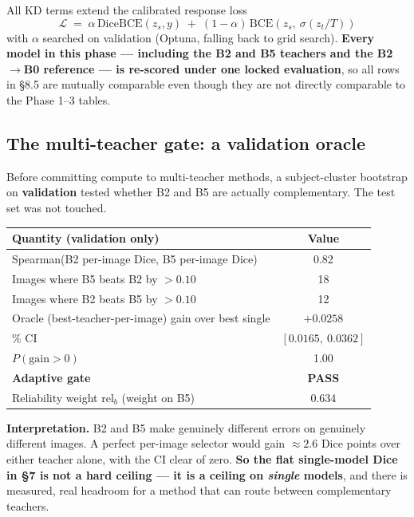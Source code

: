 \documentclass[11pt]{article}
\newcommand{\win}[1]{\textcolor{wingreen}{\textbf{#1}}}
\begin{document}
All KD terms extend the calibrated response loss
\[
  \mathcal{L}\;=\;\alpha\,\mathrm{DiceBCE}(z_s,y)\;+\;(1-\alpha)\,\mathrm{BCE}\!\left(z_s,\ \sigma(z_t/T)\right)
\]
with $\alpha$ searched on validation (Optuna, falling back to grid search). \textbf{Every model in this
phase --- including the B2 and B5 teachers and the B2$\to$B0 reference --- is re-scored under one
locked evaluation}, so all rows in \S8.5 are mutually comparable even though they are not directly
comparable to the Phase 1--3 tables.

\subsection{The multi-teacher gate: a validation oracle}

Before committing compute to multi-teacher methods, a subject-cluster bootstrap on
\textbf{validation} tested whether B2 and B5 are actually complementary. The test set was not
touched.

\begin{center}\small
\begin{tabular}{>{\raggedright\arraybackslash}p{8.6cm} C}
\toprule
\textbf{Quantity (validation only)} & \textbf{Value} \\
\midrule
Spearman(B2 per-image Dice, B5 per-image Dice)          & 0.82 \\
Images where B5 beats B2 by $>0.10$                     & 18 \\
Images where B2 beats B5 by $>0.10$                     & 12 \\
Oracle (best-teacher-per-image) gain over best single    & $+0.0258$ \\
\% CI                                            & $[0.0165,\ 0.0362]$ \\
\quad $P(\text{gain}>0)$                                 & 1.00 \\
\textbf{Adaptive gate}                                   & \win{PASS} \\
Reliability weight $\mathrm{rel}_b$ (weight on B5)       & 0.634 \\
\bottomrule
\end{tabular}
\end{center}

\textbf{Interpretation.} B2 and B5 make genuinely different errors on genuinely different images.
A perfect per-image selector would gain $\approx2.6$ Dice points over either teacher alone, with
the CI clear of zero. \textbf{So the flat single-model Dice in \S7 is not a hard ceiling --- it is
a ceiling on \emph{single} models}, and there is measured, real headroom for a method that can
route between complementary teachers.
\end{document}
